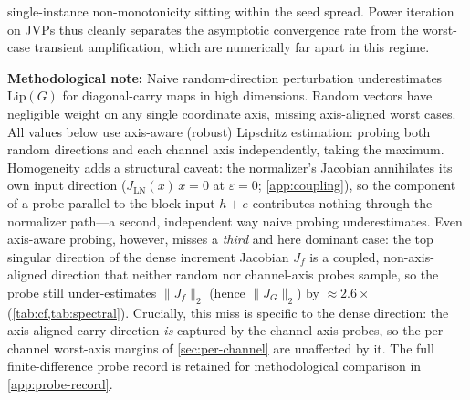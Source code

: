\documentclass[11pt]{article}
\begin{document}
single-instance non-monotonicity sitting within the seed spread. Power iteration on JVPs thus cleanly separates the asymptotic convergence rate from the worst-case transient amplification, which are numerically far apart in this regime.

\textbf{Methodological note:} Naive random-direction perturbation underestimates $\text{Lip}(G)$ for diagonal-carry maps in high dimensions. Random vectors have negligible weight on any single coordinate axis, missing axis-aligned worst cases. All values below use axis-aware (robust) Lipschitz estimation: probing both random directions and each channel axis independently, taking the maximum. Homogeneity adds a structural caveat: the normalizer's Jacobian annihilates its own input direction ($J_{\text{LN}}(x)\,x = 0$ at $\varepsilon = 0$; \cref{app:coupling}), so the component of a probe parallel to the block input $h + e$ contributes nothing through the normalizer path---a second, independent way naive probing underestimates. Even axis-aware probing, however, misses a \emph{third} and here dominant case: the top singular direction of the dense increment Jacobian $J_f$ is a coupled, non-axis-aligned direction that neither random nor channel-axis probes sample, so the probe still under-estimates $\|J_f\|_2$ (hence $\|J_G\|_2$) by $\approx 2.6\times$ (\cref{tab:cf,tab:spectral}). Crucially, this miss is specific to the dense direction: the axis-aligned carry direction \emph{is} captured by the channel-axis probes, so the per-channel worst-axis margins of \cref{sec:per-channel} are unaffected by it. The full finite-difference probe record is retained for methodological comparison in \cref{app:probe-record}.
\end{document}
